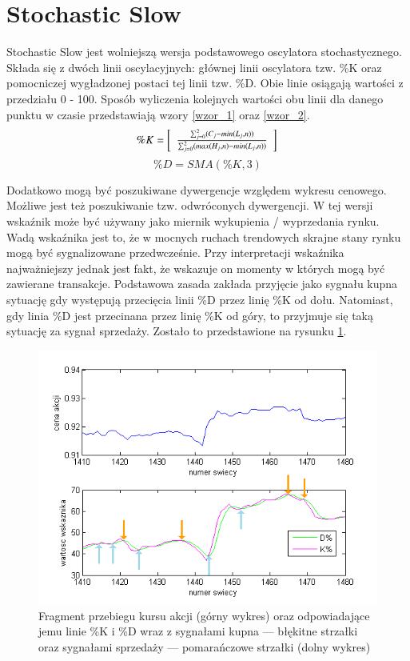 \section{Stochastic Slow}
\label{sec:1STS}

Stochastic Slow jest wolniejszą wersja podstawowego oscylatora stochastycznego. Składa się z dwóch linii oscylacyjnych: głównej linii oscylatora tzw. \%K oraz pomocniczej wygładzonej postaci tej linii tzw. \%D. Obie linie osiągają wartości z przedziału 0 - 100.  Sposób wyliczenia kolejnych wartości obu linii dla danego punktu w czasie przedstawiają wzory \ref{wzor_1} oraz \ref{wzor_2}.
\begin{equation}
\%K = \left[\begin{array}{c} \frac{ \sum_{j=0}^{2} (C_j - min(L_j, n))}{ \sum_{j=0}^{2} (max(H_j, n) - min(L_j, n))}\end{array}\right]\\
\label{wzor_1}
\end{equation}
\begin{equation}
\%D = SMA(\%K, 3)
\label{wzor_2}
\end{equation}

\noindent Dodatkowo mogą być poszukiwane dywergencje względem wykresu cenowego. Możliwe jest też poszukiwanie tzw. odwróconych dywergencji. W tej wersji wskaźnik może być używany jako miernik wykupienia / wyprzedania rynku. Wadą wskaźnika jest to, że w mocnych ruchach trendowych skrajne stany rynku mogą być sygnalizowane przedwcześnie.
Przy interpretacji wskaźnika najważniejszy jednak jest fakt, że wskazuje on momenty w których mogą być zawierane transakcje. Podstawowa zasada zakłada przyjęcie jako sygnału kupna sytuację gdy występują przecięcia linii \%D przez linię \%K od dołu. Natomiast, gdy linia \%D jest przecinana przez linię \%K od góry, to przyjmuje się taką sytuację za sygnał sprzedaży. Zostało to przedstawione na rysunku \ref{zasada}. \\
\begin{figure}[h!]
\centering
\includegraphics[width = \textwidth]{ss.png}
\caption{Fragment przebiegu kursu akcji (górny wykres) oraz odpowiadające jemu linie \%K i \%D wraz z sygnałami kupna --- błękitne strzałki oraz sygnałami sprzedaży --- pomarańczowe strzałki (dolny wykres)}
\label{zasada}
\end{figure}
\FloatBarrier

